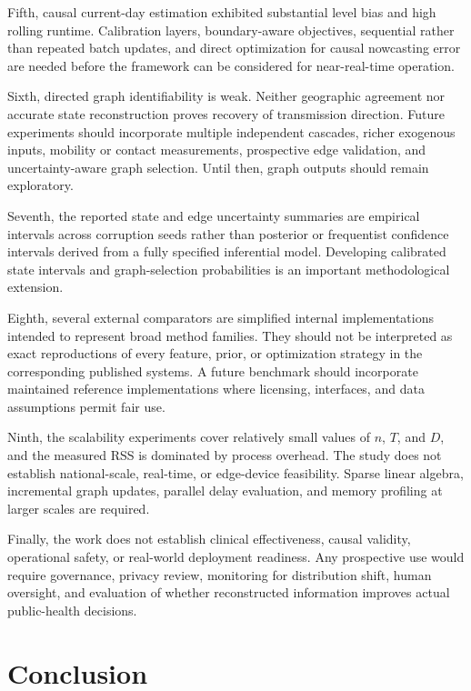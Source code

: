 Fifth, causal current-day estimation exhibited substantial level bias and high rolling runtime. Calibration layers, boundary-aware objectives, sequential rather than repeated batch updates, and direct optimization for causal nowcasting error are needed before the framework can be considered for near-real-time operation.

Sixth, directed graph identifiability is weak. Neither geographic agreement nor accurate state reconstruction proves recovery of transmission direction. Future experiments should incorporate multiple independent cascades, richer exogenous inputs, mobility or contact measurements, prospective edge validation, and uncertainty-aware graph selection. Until then, graph outputs should remain exploratory.

Seventh, the reported state and edge uncertainty summaries are empirical intervals across corruption seeds rather than posterior or frequentist confidence intervals derived from a fully specified inferential model. Developing calibrated state intervals and graph-selection probabilities is an important methodological extension.

Eighth, several external comparators are simplified internal implementations intended to represent broad method families. They should not be interpreted as exact reproductions of every feature, prior, or optimization strategy in the corresponding published systems. A future benchmark should incorporate maintained reference implementations where licensing, interfaces, and data assumptions permit fair use.

Ninth, the scalability experiments cover relatively small values of $n$, $T$, and $D$, and the measured RSS is dominated by process overhead. The study does not establish national-scale, real-time, or edge-device feasibility. Sparse linear algebra, incremental graph updates, parallel delay evaluation, and memory profiling at larger scales are required.

Finally, the work does not establish clinical effectiveness, causal validity, operational safety, or real-world deployment readiness. Any prospective use would require governance, privacy review, monitoring for distribution shift, human oversight, and evaluation of whether reconstructed information improves actual public-health decisions.

\section{Conclusion}
\label{sec:conclusion}

